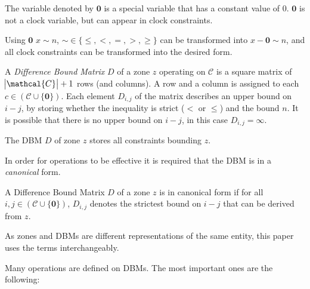 \begin{dfn}
	The variable denoted by $\textbf{0}$ is a special variable that has a constant value of 0. $\textbf{0}$ is not a clock variable, but can appear in clock constraints.
\end{dfn}

Using $\textbf{0}$ $x \sim n$,  $\sim \in \{\leq,<,=,>,\geq\}$ can be transformed into $x- \textbf{0} \sim n$, and all clock constraints can be transformed into the desired form. 


\begin{dfn}
	A \emph{Difference Bound Matrix} $D$ of a zone $z$ operating on $\mathcal{C}$ is a square matrix of $\abs{\mathcal{C}}+1$ rows (and columns). A row and a column is assigned to each $c \in (\mathcal{C} \cup \{\textbf{0}\})$. Each element $D_{i,j}$ of the matrix describes an upper bound on $i - j$, by storing whether the inequality is strict ($<$ or $\leq$) and the bound $n$. It is possible that there is no upper bound on $i-j$, in this case $D_{i,j}=\infty$.
	
	The DBM $D$ of zone $z$ stores all constraints bounding $z$.
\end{dfn}

In order for operations to be effective it is required that the DBM is in a \emph{canonical} form.

\begin{dfn}
	A Difference Bound Matrix $D$ of a zone $z$ is in canonical form if for all $i,j \in (\mathcal{C} \cup \{\textbf{0}\})$, $D_{i,j}$ denotes the strictest bound on $i-j$ that can be derived from $z$.
\end{dfn}

As zones and DBMs are different representations of the same entity, this paper uses the terms interchangeably.

Many operations are defined on DBMs. The most important ones are the following:

